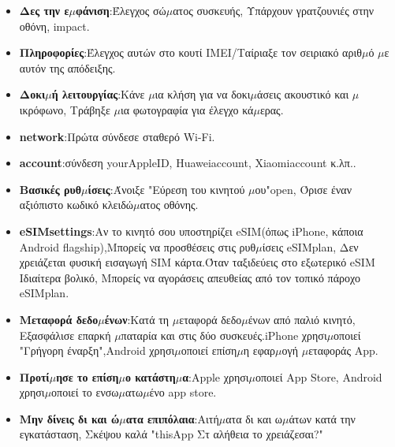 

\begin{itemize}
  \item \textbf{Δες την ε$\mu$φάνιση}:Έλεγχος σώ$\mu$ατος συσκευής, Υπάρχουν γρατζουνιές στην οθόνη, impact.
  \item \textbf{Πληροφορίες}:Έλεγχος αυτών στο κουτί IMEI/Ταίριαξε τον σειριακό αριθ$\mu$ό $\mu$ε αυτόν της απόδειξης.
  \item \textbf{Δοκι$\mu$ή λειτουργίας}:Κάνε $\mu$ια κλήση για να δοκι$\mu$άσεις ακουστικό και $\mu$ικρόφωνο, Τράβηξε $\mu$ια φωτογραφία για έλεγχο κά$\mu$ερας.
\end{itemize}


\begin{itemize}
  \item \textbf{network}:Πρώτα σύνδεσε σταθερό Wi-Fi.
  \item \textbf{account}:σύνδεση yourAppleID, Huaweiaccount, Xiaomiaccount κ.λπ..
  \item \textbf{Βασικές ρυθ$\mu$ίσεις}:Άνοιξε "Εύρεση του κινητού $\mu$ου"open, Όρισε έναν αξιόπιστο κωδικό κλειδώ$\mu$ατος οθόνης.
  \item \textbf{eSIMsettings}:Αν το κινητό σου υποστηρίζει eSIM(όπως iPhone, κάποια Android flagship),Μπορείς να προσθέσεις στις ρυθ$\mu$ίσεις eSIMplan, Δεν χρειάζεται φυσική εισαγωγή SIM κάρτα.Όταν ταξιδεύεις στο εξωτερικό eSIM Ιδιαίτερα βολικό, Μπορείς να αγοράσεις απευθείας από τον τοπικό πάροχο eSIMplan.
  \item \textbf{Μεταφορά δεδο$\mu$ένων}:Κατά τη $\mu$εταφορά δεδο$\mu$ένων από παλιό κινητό, Εξασφάλισε επαρκή $\mu$παταρία και στις δύο συσκευές.iPhone χρησι$\mu$οποιεί "Γρήγορη έναρξη",Android χρησι$\mu$οποιεί επίση$\mu$η εφαρ$\mu$ογή $\mu$εταφοράς App.
\end{itemize}


\begin{itemize}
  \item \textbf{Προτί$\mu$ησε το επίση$\mu$ο κατάστη$\mu$α}:Apple χρησι$\mu$οποιεί App Store, Android χρησι$\mu$οποιεί το ενσω$\mu$ατω$\mu$ένο app store.
  \item \textbf{Μην δίνεις δι και ώ$\mu$ατα επιπόλαια}:Αιτή$\mu$ατα δι και ω$\mu$άτων κατά την εγκατάσταση, Σκέψου καλά "thisApp Στ αλήθεια το χρειάζεσαι?"
\end{itemize}
